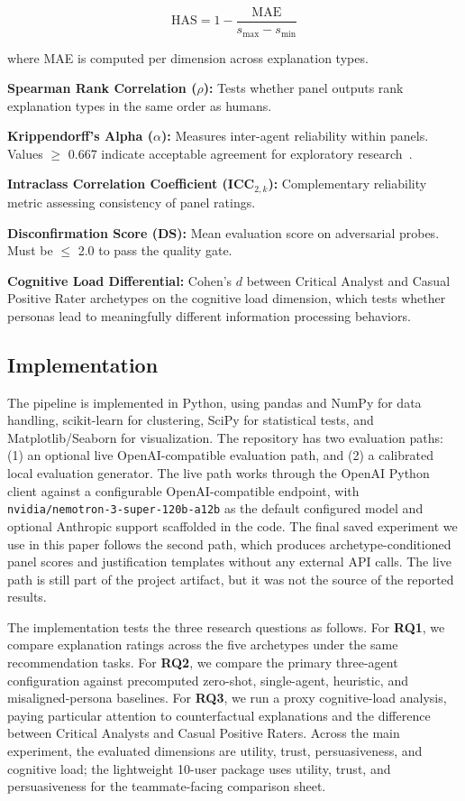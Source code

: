 \documentclass[sigconf,nonacm]{acmart}
\begin{document}
\begin{equation}
\text{HAS} = 1 - \frac{\text{MAE}}{s_{\max} - s_{\min}}
\end{equation}

where MAE is computed per dimension across explanation types.

\textbf{Spearman Rank Correlation ($\rho$):} Tests whether panel outputs rank explanation types in the same order as humans.

\textbf{Krippendorff's Alpha ($\alpha$):} Measures inter-agent reliability within panels. Values $\geq$ 0.667 indicate acceptable agreement for exploratory research~\cite{krippendorff2011}.

\textbf{Intraclass Correlation Coefficient (ICC$_{2,k}$):} Complementary reliability metric assessing consistency of panel ratings.

\textbf{Disconfirmation Score (DS):} Mean evaluation score on adversarial probes. Must be $\leq$ 2.0 to pass the quality gate.

\textbf{Cognitive Load Differential:} Cohen's $d$ between Critical Analyst and Casual Positive Rater archetypes on the cognitive load dimension, which tests whether personas lead to meaningfully different information processing behaviors.

\subsection{Implementation}

The pipeline is implemented in Python, using pandas and NumPy for data handling, scikit-learn for clustering, SciPy for statistical tests, and Matplotlib/Seaborn for visualization. The repository has two evaluation paths: (1) an optional live OpenAI-compatible evaluation path, and (2) a calibrated local evaluation generator. The live path works through the OpenAI Python client against a configurable OpenAI-compatible endpoint, with \texttt{nvidia/nemotron-3-super-120b-a12b} as the default configured model and optional Anthropic support scaffolded in the code. The final saved experiment we use in this paper follows the second path, which produces archetype-conditioned panel scores and justification templates without any external API calls. The live path is still part of the project artifact, but it was not the source of the reported results.

The implementation tests the three research questions as follows. For \textbf{RQ1}, we compare explanation ratings across the five archetypes under the same recommendation tasks. For \textbf{RQ2}, we compare the primary three-agent configuration against precomputed zero-shot, single-agent, heuristic, and misaligned-persona baselines. For \textbf{RQ3}, we run a proxy cognitive-load analysis, paying particular attention to counterfactual explanations and the difference between Critical Analysts and Casual Positive Raters. Across the main experiment, the evaluated dimensions are utility, trust, persuasiveness, and cognitive load; the lightweight 10-user package uses utility, trust, and persuasiveness for the teammate-facing comparison sheet.
\end{document}
